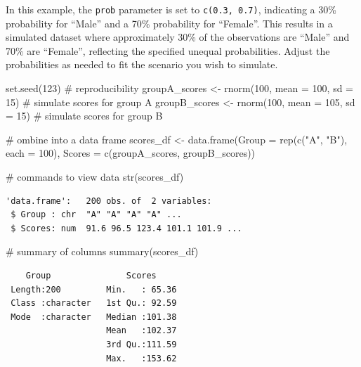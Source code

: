 \documentclass[
  singlecolumn]{article}
\newenvironment{Shaded}{}{}
\newcommand{\AttributeTok}[1]{\textcolor[rgb]{0.84,0.23,0.29}{#1}}
\newcommand{\CommentTok}[1]{\textcolor[rgb]{0.42,0.45,0.49}{#1}}
\newcommand{\DecValTok}[1]{\textcolor[rgb]{0.00,0.36,0.77}{#1}}
\newcommand{\FunctionTok}[1]{\textcolor[rgb]{0.44,0.26,0.76}{#1}}
\newcommand{\NormalTok}[1]{\textcolor[rgb]{0.14,0.16,0.18}{#1}}
\newcommand{\OtherTok}[1]{\textcolor[rgb]{0.44,0.26,0.76}{#1}}
\newcommand{\StringTok}[1]{\textcolor[rgb]{0.01,0.18,0.38}{#1}}
\theoremstyle{definition}
\theoremstyle{remark}
\begin{document}
In this example, the \texttt{prob} parameter is set to
\texttt{c(0.3,\ 0.7)}, indicating a 30\% probability for ``Male'' and a
70\% probability for ``Female''. This results in a simulated dataset
where approximately 30\% of the observations are ``Male'' and 70\% are
``Female'', reflecting the specified unequal probabilities. Adjust the
probabilities as needed to fit the scenario you wish to simulate.

\begin{Shaded}
\begin{Highlighting}[]
\FunctionTok{set.seed}\NormalTok{(}\DecValTok{123}\NormalTok{) }\CommentTok{\#  reproducibility}
\NormalTok{groupA\_scores }\OtherTok{\textless{}{-}} \FunctionTok{rnorm}\NormalTok{(}\DecValTok{100}\NormalTok{, }\AttributeTok{mean =} \DecValTok{100}\NormalTok{, }\AttributeTok{sd =} \DecValTok{15}\NormalTok{) }\CommentTok{\# simulate scores for group A}
\NormalTok{groupB\_scores }\OtherTok{\textless{}{-}} \FunctionTok{rnorm}\NormalTok{(}\DecValTok{100}\NormalTok{, }\AttributeTok{mean =} \DecValTok{105}\NormalTok{, }\AttributeTok{sd =} \DecValTok{15}\NormalTok{) }\CommentTok{\# simulate scores for group B}

\CommentTok{\# ombine into a data frame}
\NormalTok{scores\_df }\OtherTok{\textless{}{-}} \FunctionTok{data.frame}\NormalTok{(}\AttributeTok{Group =} \FunctionTok{rep}\NormalTok{(}\FunctionTok{c}\NormalTok{(}\StringTok{"A"}\NormalTok{, }\StringTok{"B"}\NormalTok{), }\AttributeTok{each =} \DecValTok{100}\NormalTok{), }\AttributeTok{Scores =} \FunctionTok{c}\NormalTok{(groupA\_scores, groupB\_scores))}

\CommentTok{\# commands to view data}
\FunctionTok{str}\NormalTok{(scores\_df)}
\end{Highlighting}
\end{Shaded}

\begin{verbatim}
'data.frame':   200 obs. of  2 variables:
 $ Group : chr  "A" "A" "A" "A" ...
 $ Scores: num  91.6 96.5 123.4 101.1 101.9 ...
\end{verbatim}

\begin{Shaded}
\begin{Highlighting}[]
\CommentTok{\# summary of columns}
\FunctionTok{summary}\NormalTok{(scores\_df)}
\end{Highlighting}
\end{Shaded}

\begin{verbatim}
    Group               Scores      
 Length:200         Min.   : 65.36  
 Class :character   1st Qu.: 92.59  
 Mode  :character   Median :101.38  
                    Mean   :102.37  
                    3rd Qu.:111.59  
                    Max.   :153.62  
\end{verbatim}
\end{document}
